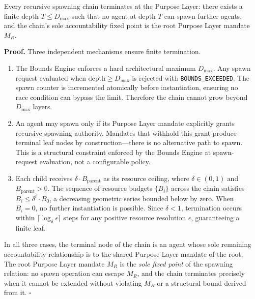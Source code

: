 \begin{theorem}
Every recursive spawning chain terminates at the Purpose Layer: there exists a finite depth $T \leq D_{\max}$ such that no agent at depth $T$ can spawn further agents, and the chain's sole accountability fixed point is the root Purpose Layer mandate $M_R$.
\end{theorem}

\medskip\noindent
\textbf{Proof.} Three independent mechanisms ensure finite termination.

\begin{enumerate}
    \item[\textbf{Depth bound.}] The Bounds Engine enforces a hard architectural maximum $D_{\max}$. Any spawn request evaluated when $\text{depth} \geq D_{\max}$ is rejected with \texttt{BOUNDS\_EXCEEDED}. The spawn counter is incremented atomically before instantiation, ensuring no race condition can bypass the limit. Therefore the chain cannot grow beyond $D_{\max}$ layers.

    \item[\textbf{Mandate-based spawning authority.}] An agent may spawn only if its Purpose Layer mandate explicitly grants recursive spawning authority. Mandates that withhold this grant produce terminal leaf nodes by construction—there is no alternative path to spawn. This is a structural constraint enforced by the Bounds Engine at spawn-request evaluation, not a configurable policy.

    \item[\textbf{Geometric resource decay.}] Each child receives $\delta \cdot B_{\text{parent}}$ as its resource ceiling, where $\delta \in (0,1)$ and $B_{\text{parent}} > 0$. The sequence of resource budgets $\{B_i\}$ across the chain satisfies $B_i \leq \delta^i \cdot B_0$, a decreasing geometric series bounded below by zero. When $B_i = 0$, no further instantiation is possible. Since $\delta < 1$, termination occurs within $\lceil \log_\delta \epsilon \rceil$ steps for any positive resource resolution $\epsilon$, guaranteeing a finite leaf.
\end{enumerate}

In all three cases, the terminal node of the chain is an agent whose sole remaining accountability relationship is to the shared Purpose Layer mandate of the root. The root Purpose Layer mandate $M_R$ is the \emph{sole fixed point} of the spawning relation: no spawn operation can escape $M_R$, and the chain terminates precisely when it cannot be extended without violating $M_R$ or a structural bound derived from it. $\square$

